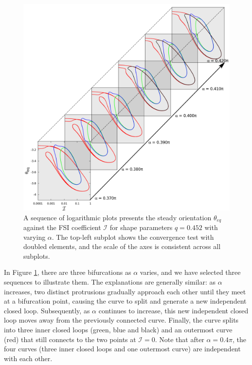 \documentclass[12pt,MSc,twoside]{muthesis_2020}
\begin{document}
\begin{figure}[!h]
\begin{minipage}{\linewidth}
	\end{minipage}
	\begin{minipage}{\linewidth}
		\centering
		\includegraphics[scale=0.166]{plot/elastic_beam_I_theta_q_0.452_alpha_restart3.png}
	\end{minipage}
	\caption{A sequence of logarithmic plots presents the steady orientation $\theta_{eq}$ against the FSI coefficient $\mathcal{I}$ for shape parameters $q = 0.452$ with varying $\alpha$. The top-left subplot shows the convergence test with doubled elements, and the scale of the axes is consistent across all subplots.}
	\label{fig:11}
\end{figure}
In Figure \ref{fig:11}, there are three bifurcations as $\alpha$ varies, and we have selected three sequences to illustrate them. The explanations are generally similar: as $\alpha$ increases, two distinct protrusions gradually approach each other until they meet at a bifurcation point, causing the curve to split and generate a new independent closed loop. Subsequently, as $\alpha$ continues to increase, this new independent closed loop moves away from the previously connected curve. Finally, the curve splits into three inner closed loops (green, blue and black) and an outermost curve (red) that still connects to the two points at $\mathcal{I} = 0$. Note that after $\alpha=0.4\pi$, the four curves (three inner closed loops and one outermost curve) are independent with each other.
\end{document}

